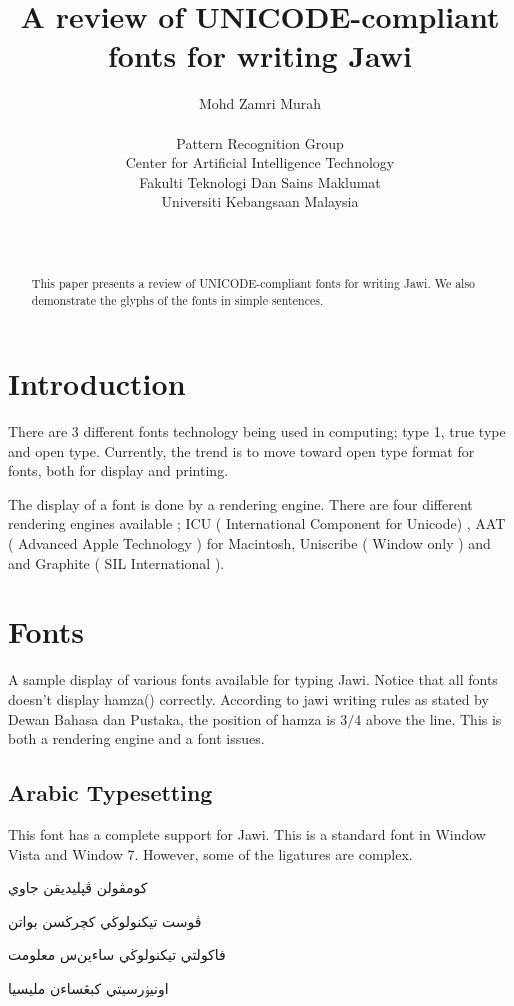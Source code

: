 \documentclass[12pt,a4paper]{IEEEconf}
\author{Mohd Zamri Murah\\
\begin{affiliation}
Pattern Recognition Group\\
Center for Artificial Intelligence Technology\\
Fakulti Teknologi Dan Sains Maklumat\\
Universiti Kebangsaan Malaysia\\
\end{affiliation}\\
\email{zamri@ftsm.ukm.my}}
\title{A review of UNICODE-compliant fonts for writing Jawi}
\begin{document}
\maketitle

\begin{abstract}
This paper presents a review of UNICODE-compliant fonts for writing Jawi. We also demonstrate the glyphs of the fonts in simple sentences.
\end{abstract}

\section{Introduction}

There are 3 different fonts technology being used in computing; type 1, true type and open type. Currently, the trend is to move toward open type format for fonts, both for display and printing.

The display of a font is done by a rendering engine.  There are four different rendering engines available ; ICU ( International Component for Unicode) , AAT ( Advanced Apple Technology ) for Macintosh, Uniscribe ( Window only )  and and Graphite ( SIL International ).


\section{Fonts}

A sample display of various fonts available for typing Jawi. Notice that all fonts doesn't display hamza() correctly. According to jawi writing rules as stated by Dewan Bahasa dan Pustaka, the position of hamza is $3/4$ above the line. This is both a rendering engine and a font issues.


\subsection{Arabic Typesetting}

\newfontfamily{}
This font has a complete support for Jawi. This is a standard font in Window Vista and Window 7. However, some of the ligatures are complex.
\begin{arab}
\begin{center}
کومڤولن ڤڽليديقن جاوي
\par  
ڤوست تيكنولوڬي کچرڬسن بواتن
\par  
فاکولتي تيكنولوڬي ساءين‌س معلومت
\par  
اونيۏرسيتي کبڠساءن مليسيا
\par  
\end{center}
\end{arab}
\end{document}
